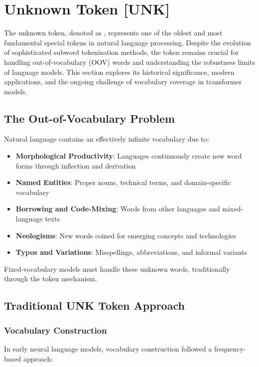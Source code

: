 \section{Unknown Token [UNK]}

The unknown token, denoted as \unk{}, represents one of the oldest and most fundamental special tokens in natural language processing. Despite the evolution of sophisticated subword tokenization methods, the \unk{} token remains crucial for handling out-of-vocabulary (OOV) words and understanding the robustness limits of language models. This section explores its historical significance, modern applications, and the ongoing challenge of vocabulary coverage in transformer models.

\subsection{The Out-of-Vocabulary Problem}

Natural language contains an effectively infinite vocabulary due to:

\begin{itemize}
\item \textbf{Morphological Productivity}: Languages continuously create new word forms through inflection and derivation
\item \textbf{Named Entities}: Proper nouns, technical terms, and domain-specific vocabulary
\item \textbf{Borrowing and Code-Mixing}: Words from other languages and mixed-language texts
\item \textbf{Neologisms}: New words coined for emerging concepts and technologies
\item \textbf{Typos and Variations}: Misspellings, abbreviations, and informal variants
\end{itemize}

Fixed-vocabulary models must handle these unknown words, traditionally through the \unk{} token mechanism.

\subsection{Traditional UNK Token Approach}

\subsubsection{Vocabulary Construction}
In early neural language models, vocabulary construction followed a frequency-based approach:

